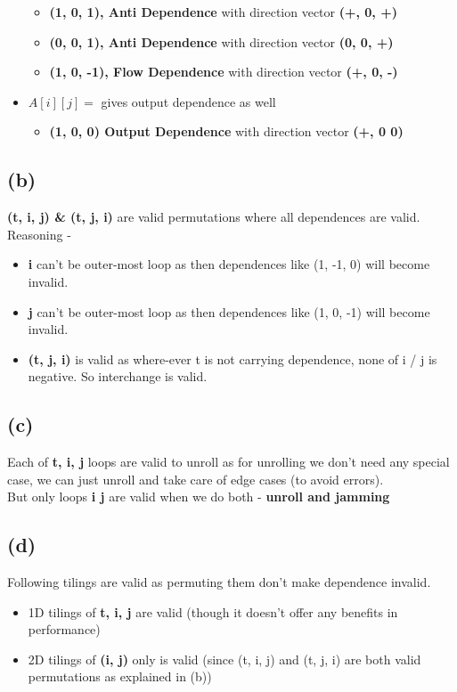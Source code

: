 \documentclass[a4paper]{article}
\begin{document}
\begin{itemize}
	\begin{itemize}
	\item {\bf (1, 0, 1), Anti Dependence} with direction vector {\bf (+, 0, +)}
	\item {\bf (0, 0, 1), Anti Dependence} with direction vector {\bf (0, 0, +)}
	\item {\bf (1, 0, -1), Flow Dependence} with direction vector {\bf (+, 0, -)}
	\end{itemize}
\item $A[i][j] = $ gives output dependence as well
	\begin{itemize}
	\item {\bf (1, 0, 0) Output Dependence} with direction vector {\bf (+, 0 0)}
	\end{itemize}
\end{itemize}

\subsection{(b)} 
{\bf (t, i, j) \& (t, j, i)} are valid permutations where all dependences are valid. Reasoning - 
\begin{itemize}
\item {\bf i} can't be outer-most loop as then dependences like (1, -1, 0) will become invalid.
\item {\bf j} can't be outer-most loop as then dependences like (1, 0, -1) will become invalid.
\item {\bf (t, j, i)} is valid as where-ever t is not carrying dependence, none of i / j is negative. So interchange is valid.
\end{itemize}

\subsection{(c)} Each of {\bf t, i, j} loops are valid to unroll as for unrolling we don't need any special case, we can just unroll and take care of edge cases (to avoid errors). \\
But only loops {\bf i j} are valid when we do both - {\bf unroll and jamming}

\subsection{(d)} Following tilings are valid as permuting them don't make dependence invalid.
\begin{itemize}
\item 1D tilings of {\bf t, i, j} are valid (though it doesn't offer any benefits in performance)
\item 2D tilings of {\bf (i, j)} only is valid (since (t, i, j) and (t, j, i) are both valid permutations as explained in (b))
\end{itemize}
\end{document}
